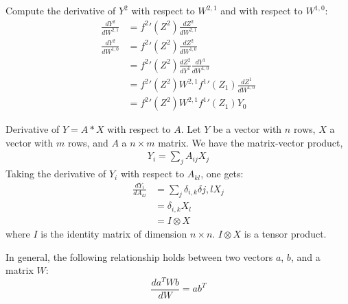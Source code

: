 \documentclass{article}
\begin{document}
Compute the derivative of $Y^2$ with respect to $W^{2,1}$ and with respect to $W^{1,0}$: 
\begin{align}
\frac{dY^2}{dW^{2,1}} &= {f^2}'(Z^2) \frac{dZ^2}{dW^{2,1}} \\
\frac{dY^2}{dW^{1,0}} &= {f^2}'(Z^2) \frac{dZ^2}{dW^{1,0}} \\
                      &= {f^2}'(Z^2) \frac{dZ^2}{dY^{1}} \frac{dY^{1}}{dW^{1,0}} \\
                      &= {f^2}'(Z^2) W^{2,1} {f^1}'(Z_1)\frac{dZ^1}{dW^{1,0}} \\     %
                      &= {f^2}'(Z^2) W^{2,1} {f^1}'(Z_1) Y_0     
\end{align}

Derivative of $Y=A*X$ with respect to $A$. Let $Y$ be a vector with $n$ rows, $X$ a vector with $m$ rows, and $A$ a $n\times m$ matrix. 
We have the matrix-vector product, 
\begin{align}
Y_i = \sum_j A_{ij} X_j
\end{align}
Taking the derivative of $Y_i$ with respect to $A_{kl}$, one gets: 
\begin{align}
\frac{dY_i}{dA_{kl}} &= \sum_j \delta_{i,k}\delta{j,l} X_j \\
                     &=   \delta_{i,k} X_l \\
                     &=   I \otimes X 
\end{align}
where $I$ is the identity matrix of dimension $n\times n$. $I\otimes X$ is a tensor product. 

In general, the following relationship holds between two vectors $a$, $b$, and a matrix $W$: 
$$
\frac{da^TWb}{dW} = a b^T
$$
\end{document}
